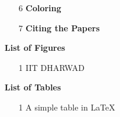 \documentclass[12pt,a4paper]{article}
\begin{document}
\begin{itemize}
\begin{enumerate}
			\item[6] \textbf{Coloring} 
			\item[7] \textbf{Citing the Papers} 
		\end{enumerate}
		\item[] \textbf{List of Figures}
		\begin{enumerate}
			\item[1] IIT DHARWAD 
		\end{enumerate}
		\item[] \textbf{List of Tables}
		\begin{enumerate}
			\item[1] A simple table in LaTeX 
		\end{enumerate}
	\end{itemize}
	\pagebreak
	
\end{document}
